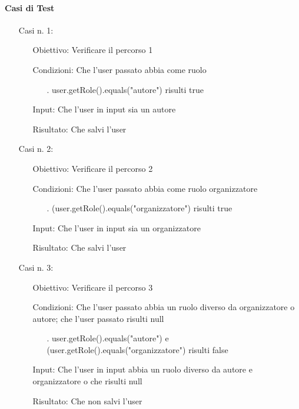 \paragraph{Casi di Test}
\begin{itemize}
\item[Casi n. 1:]
\begin{itemize}
\item[Obiettivo:] Verificare il percorso 1
\item[Condizioni:] Che l'user passato abbia come ruolo 
\begin{itemize}
\item[.] user.getRole().equals("autore") risulti true
\end{itemize}
\item[Input:] Che l'user in input sia un autore
\item[Risultato:] Che salvi l'user
\end{itemize}
\item[Casi n. 2:]
\begin{itemize}
\item[Obiettivo:] Verificare il percorso 2
\item[Condizioni:] Che l'user passato abbia come ruolo organizzatore
\begin{itemize}
\item[.] (user.getRole().equals("organizzatore") risulti true
\end{itemize}
\item[Input:] Che l'user in input sia un organizzatore
\item[Risultato:] Che salvi l'user
\end{itemize}
\item[Casi n. 3:]
\begin{itemize}
\item[Obiettivo:] Verificare il percorso 3
\item[Condizioni:] Che l'user passato abbia un ruolo diverso da organizzatore o autore; che l'user passato risulti null
\begin{itemize}
\item[.]  user.getRole().equals("autore") e (user.getRole().equals("organizzatore") risulti false
\end{itemize}
\item[Input:] Che l'user in input abbia un ruolo diverso da autore e organizzatore o che risulti null
\item[Risultato:] Che non salvi l'user
\end{itemize}
\end{itemize}

